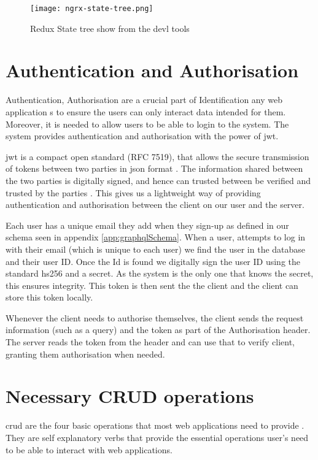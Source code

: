 \begin{figure}[htb!]
    \centering
    \texttt{[image: ngrx-state-tree.png]}
    \caption{Redux State tree show from the devl tools}
    \label{fig:reduxStateTree}
\end{figure}

\section{Authentication and Authorisation}
Authentication, Authorisation  are a crucial part of Identification any web application s to ensure the users can only interact data intended for them. Moreover, it is needed to allow users to be able to login to the system. The system provides authentication and authorisation with the power of \acrfull{jwt}.

\acrshort{jwt} is a compact open standard (RFC 7519), that allows the secure transmission of tokens between two parties in  \acrshort{json} format \cite{jones2015json}. The information shared between the two parties is digitally signed, and hence can trusted between be verified and trusted by the parties \cite{auth02019json}. This gives us a lightweight way of providing authentication and authorisation between the client on our user and the server.

Each user has a unique email they add when they sign-up as defined in our schema seen in appendix \ref{app:graphqlSchema}. When a user, attempts to log in with their email (which is unique to each user) we find the user in the database and their user ID. Once the Id is found we digitally sign the user ID using the standard \acrfull{hs256} and a secret. As the system is the only one that knows the secret, this ensures integrity. This token is then sent the the client and the client can store this token locally.

Whenever the client needs to authorise themselves, the client sends the request information (such as a query) and the token as part of the Authorisation header. The server reads the token from the header and can use that to verify client, granting them authorisation when needed.

\section{Necessary CRUD operations} \label{sec:ExtraFeatures}
\acrfull{crud} are the four basic operations that most web applications need to provide \cite{codeacademy2019crud}. They are self explanatory verbs that provide the essential operations user's need to be able to interact with web applications.

